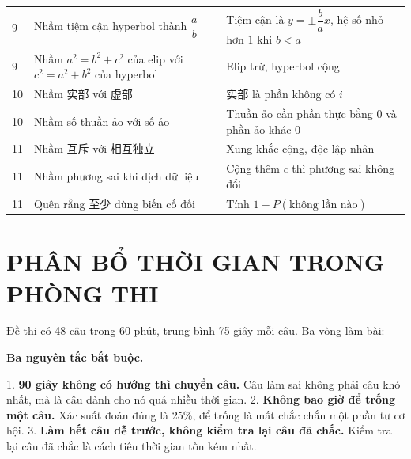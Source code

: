 \documentclass[11pt, a4paper]{article}
\begin{document}
{\begin{tabularx}{\linewidth}{@{\hspace{6pt}}llX@{\hspace{6pt}}}
9 & Nhầm tiệm cận hyperbol thành $\dfrac{a}{b}$ & Tiệm cận là $y = \pm\dfrac{b}{a}x$, hệ số nhỏ hơn $1$ khi $b < a$ \\
9 & Nhầm $a^2 = b^2 + c^2$ của elip với $c^2 = a^2 + b^2$ của hyperbol & Elip trừ, hyperbol cộng \\
10 & Nhầm 实部 với 虚部 & 实部 là phần không có $i$ \\
10 & Nhầm số thuần ảo với số ảo & Thuần ảo cần phần thực bằng $0$ và phần ảo khác $0$ \\
11 & Nhầm 互斥 với 相互独立 & Xung khắc cộng, độc lập nhân \\
11 & Nhầm phương sai khi dịch dữ liệu & Cộng thêm $c$ thì phương sai không đổi \\
11 & Quên rằng 至少 dùng biến cố đối & Tính $1 - P(\text{không lần nào})$ \\
\bottomrule
\end{tabularx}}

\section{PHÂN BỔ THỜI GIAN TRONG PHÒNG THI}

Đề thi có 48 câu trong 60 phút, trung bình 75 giây mỗi câu. Ba vòng làm bài:


\textbf{Ba nguyên tắc bắt buộc.}

1. \textbf{90 giây không có hướng thì chuyển câu.} Câu làm sai không phải câu khó nhất, mà là câu dành cho nó quá nhiều thời gian.
2. \textbf{Không bao giờ để trống một câu.} Xác suất đoán đúng là 25\%, để trống là mất chắc chắn một phần tư cơ hội.
3. \textbf{Làm hết câu dễ trước, không kiểm tra lại câu đã chắc.} Kiểm tra lại câu đã chắc là cách tiêu thời gian tốn kém nhất.
\end{document}
